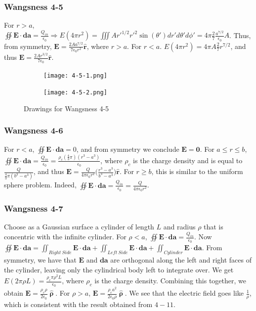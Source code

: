 \documentclass{article}
\theoremstyle{mystyle}
\begin{document}
\subsubsection{Wangsness 4-5}
For $r>a$, $\oiint \mathbf{E}\cdot \mathbf{da} = \frac{Q_{in}}{\epsilon_0} \Rightarrow E(4\pi r^2) = \iiint A r'^{1/2}r'^2 \sin(\theta ')dr'd\theta'd\phi' = 4\pi \frac{2}{7}\frac{a^{7/2}}{\epsilon_0}A$. Thus, from symmetry, $\mathbf{E} = \frac{2A a^{7/2}}{7 \epsilon_0 r^2}\hat{\mathbf{r}}$, where $r>a$. For $r<a$. $E(4\pi r^2) = 4\pi A \frac{2}{7}r^{7/2}$, and thus $\mathbf{E} = \frac{2Ar^{3/2}}{7\epsilon_0}\hat{\mathbf{r}}$. 
\begin{figure}
  \begin{subfigure}[b]{0.49\textwidth}
     \centering
    \texttt{[image: 4-5-1.png]}
  \end{subfigure}
  \begin{subfigure}[b]{0.49\textwidth}
    \centering
    \texttt{[image: 4-5-2.png]}
  \end{subfigure}
  \caption{Drawings for Wangsness 4-5}
\end{figure}
\subsubsection{Wangsness 4-6}
For $r<a$, $\oiint\mathbf{E} \cdot \mathbf{da} = 0$, and from symmetry we conclude $\mathbf{E} = \mathbf{0}$. For $a\leq r \leq b$, $\oiint \mathbf{E}\cdot \mathbf{da} = \frac{Q_{in}}{\epsilon_0} = \frac{\rho_c(\frac{4}{3}\pi)(r^3-a^3)}{\epsilon_0}$, where $\rho_c$ is the charge density and is equal to $\frac{Q}{\frac{4}{3}\pi(b^3-a^3)}$, and thus $\mathbf{E} = \frac{Q}{4\pi \epsilon_0 r^2}\bigg(\frac{r^3-a^3}{b^3-a^3}\bigg)\hat{\mathbf{r}}$. For $r\geq b$, this is similar to the uniform sphere problem. Indeed, $\oiint \mathbf{E}\cdot \mathbf{da} = \frac{Q_{in}}{\epsilon_0} = \frac{Q}{4\pi \epsilon_0 r^2}$.
\subsubsection{Wangsness 4-7}
Choose as a Gaussian surface a cylinder of length $L$ and radius $\rho$ that is concentric with the infinite cylinder. For $\rho<a$, $\oiint \mathbf{E}\cdot \mathbf{da} = \frac{Q_{in}}{\epsilon_0}$. Now $\oiint \mathbf{E} \cdot \mathbf{da} = \iint_{Right\ Side} \mathbf{E}\cdot \mathbf{da} + \iint_{Left\ Side}\mathbf{E}\cdot \mathbf{da} + \iint_{Cylinder} \mathbf{E}\cdot \mathbf{da}$. From symmetry, we have that $\mathbf{E}$ and $\mathbf{da}$ are orthogonal along the left and right faces of the cylinder, leaving only the cylindrical body left to integrate over. We get $E(2\pi \rho L) = \frac{\rho_c \pi \rho^2 L}{\epsilon_0}$, where $\rho_c$ is the charge density. Combining this together, we obtain $\mathbf{E} = \frac{\rho_c \rho}{2\epsilon_0} \hat{\boldsymbol{\uprho}}$. For $\rho>a$, $\mathbf{E} = \frac{\rho_{c} a^2}{2\epsilon_0 \rho}\hat{\boldsymbol{\uprho}}$. We see that the electric field goes like $\frac{1}{\rho}$, which is consistent with the result obtained from $4-11$.
\end{document}
